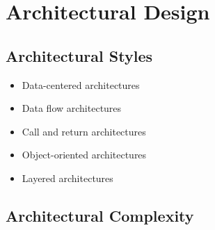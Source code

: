 \newpage
\section{Architectural Design}
\subsection{Architectural Styles}
\begin{itemize}
    \item Data-centered architectures
    \item Data flow architectures
    \item Call and return architectures
    \item Object-oriented architectures
    \item Layered architectures
\end{itemize}


\subsection{Architectural Complexity}
